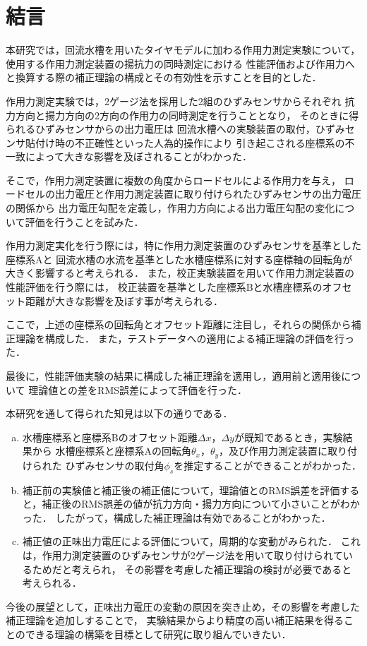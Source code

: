 \section{結言}
本研究では，回流水槽を用いたタイヤモデルに加わる作用力測定実験について，
使用する作用力測定装置の揚抗力の同時測定における
性能評価および作用力へと換算する際の補正理論の構成とその有効性を示すことを目的とした．

作用力測定実験では，2ゲージ法を採用した2組のひずみセンサからそれぞれ
抗力方向と揚力方向の2方向の作用力の同時測定を行うこととなり，
そのときに得られるひずみセンサからの出力電圧は
回流水槽への実験装置の取付，ひずみセンサ貼付け時の不正確性といった人為的操作により
引き起こされる座標系の不一致によって大きな影響を及ぼされることがわかった．

そこで，作用力測定装置に複数の角度からロードセルによる作用力を与え，
ロードセルの出力電圧と作用力測定装置に取り付けられたひずみセンサの出力電圧の関係から
出力電圧勾配を定義し，作用力方向による出力電圧勾配の変化について評価を行うことを試みた．

作用力測定実化を行う際には，特に作用力測定装置のひずみセンサを基準とした座標系Aと
回流水槽の水流を基準とした水槽座標系に対する座標軸の回転角が大きく影響すると考えられる．
また，校正実験装置を用いて作用力測定装置の性能評価を行う際には，
校正装置を基準とした座標系Bと水槽座標系のオフセット距離が大きな影響を及ぼす事が考えられる．

ここで，上述の座標系の回転角とオフセット距離に注目し，それらの関係から補正理論を構成した．
また，テストデータへの適用による補正理論の評価を行った．

最後に，性能評価実験の結果に構成した補正理論を適用し，適用前と適用後について
理論値との差をRMS誤差によって評価を行った．

本研究を通して得られた知見は以下の通りである．

\begin{enumerate}[(a)]
    \item   水槽座標系と座標系Bのオフセット距離$\Delta x$，$\Delta y$が既知であるとき，実験結果から
            水槽座標系と座標系Aの回転角$\theta_x$，$\theta_y$，及び作用力測定装置に取り付けられた
            ひずみセンサの取付角$\phi_s$を推定することができることがわかった．\\
    \item   補正前の実験値と補正後の補正値について，理論値とのRMS誤差を評価すると，補正後のRMS誤差の値が抗力方向・揚力方向について小さいことがわかった．
            したがって，構成した補正理論は有効であることがわかった．\\
    \item   補正値の正味出力電圧による評価について，周期的な変動がみられた．
            これは，作用力測定装置のひずみセンサが2ゲージ法を用いて取り付けられているためだと考えられ，
            その影響を考慮した補正理論の検討が必要であると考えられる．
\end{enumerate}

今後の展望として，正味出力電圧の変動の原因を突き止め，その影響を考慮した補正理論を追加しすることで，
実験結果からより精度の高い補正結果を得ることのできる理論の構築を目標として研究に取り組んでいきたい．
